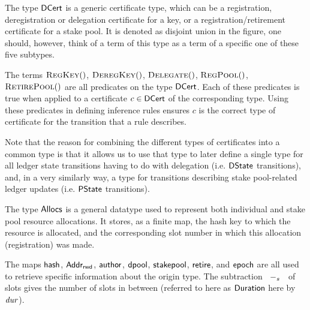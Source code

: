 The type $\mathsf{DCert}$ is a generic certificate type, which can be a registration,
deregistration or delegation certificate for a key, or a registration/retirement
 certificate for a stake pool. It is denoted as disjoint union in the figure,
one should, however, think of a term of this type as a term of a specific
one of these five subtypes.

The terms $\RegKey$, $\DeregKey$, $\Delegate$, $\RegPool$, $\RetirePool$ are
all predicates on the type $\mathsf{DCert}$. Each of these predicates is true
when applied to a certificate $c \in \mathsf{DCert}$ of the corresponding type.
Using these predicates in defining inference rules ensures $c$ is the correct
type of certificate for the transition
that a rule describes.

Note that the reason for combining the different types of
certificates into a common type is that it allows us to use that type to later
define a single type for all
ledger state transitions having to do with delegation (i.e. $\mathsf{DState}$
transitions),
and, in a very similarly
way, a type for transitions describing stake pool-related ledger updates
(i.e. $\mathsf{PState}$ transitions).

The type $\mathsf{Allocs}$ is a general datatype used to represent both individual and stake
pool resource allocations. It stores, as a finite map, the hash key to which the resource is
allocated, and the corresponding slot number in which this allocation
(registration) was made.

The maps $\mathsf{hash}$, $\mathsf{Addr_{rwd}}$, $\mathsf{author}$, $\mathsf{dpool}$,
$\mathsf{stakepool}$,
$\mathsf{retire}$, and $\mathsf{epoch}$ are all used to
retrieve specific information about the origin type. The subtraction $\mathit{}~-_{s}~\mathit{}$
of slots gives the number of slots in between (referred to here as
$\mathsf{Duration}$ here by $\mathit{dur}$).




